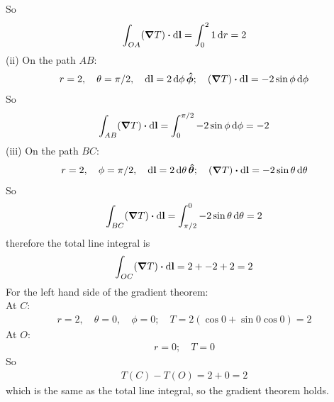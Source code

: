\documentclass[../main.tex]{subfiles}
\begin{document}
So
\begin{align*}
    \int_{OA} (\grad{T}) \vdot \dd{\vb{l}} = \int_0^2 1 \dd{r} = 2
\end{align*}
(ii) On the path $AB$:
\begin{align*}
    r = 2, \quad \theta = \pi/2, \quad \dd{\vb{l}} = 2 \dd{\phi}\vu*{\phi};
    \quad (\grad{T}) \vdot \dd{\vb{l}} = -2 \sin\phi \dd{\phi}
\end{align*}
So
\begin{align*}
    \int_{AB} (\grad{T}) \vdot \dd{\vb{l}} = \int_0^{\pi/2} -2 \sin\phi \dd{\phi} = -2
\end{align*}
(iii) On the path $BC$:
\begin{align*}
    r = 2, \quad \phi = \pi/2, \quad \dd{\vb{l}} = 2 \dd{\theta}\vu*{\theta};
    \quad (\grad{T}) \vdot \dd{\vb{l}} = -2 \sin\theta \dd{\theta}
\end{align*}
So
\begin{align*}
    \int_{BC} (\grad{T}) \vdot \dd{\vb{l}} = \int_{\pi/2}^0 -2 \sin\theta \dd{\theta} = 2
\end{align*}
therefore the total line integral is
\begin{align*}
    \int_{OC} (\grad{T}) \vdot \dd{\vb{l}} = 2 + -2 + 2 = 2
\end{align*}
For the left hand side of the gradient theorem: \\
At $C$:
\begin{align*}
    r = 2, \quad \theta = 0, \quad \phi = 0; \quad T = 2(\cos{0} + \sin{0} \cos{0}) = 2
\end{align*}
At $O$:
\begin{align*}
    r = 0; \quad T = 0
\end{align*}
So
\begin{align*}
    T(C) - T(O) = 2 + 0 = 2
\end{align*}
which is the same as the total line integral, so the gradient theorem holds.
\end{document}
